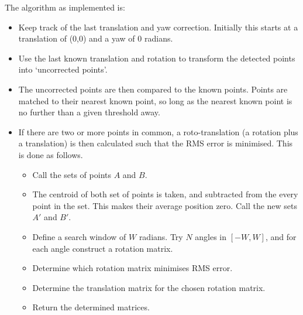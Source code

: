 \documentclass[12pt,oneside,a4paper]{book}
\begin{document}
The algorithm as implemented is:
\begin{itemize}
\item Keep track of the last translation and yaw correction. Initially
  this starts at a translation of (0,0) and a yaw of 0 radians.
\item Use the last known translation and rotation to transform the
  detected points into `uncorrected points'.
\item The uncorrected points are then compared to the known
  points. Points are matched to their nearest known point, so long as
  the nearest known point is no further than a given threshold away.
\item If there are two or more points in common, a roto-translation (a
  rotation plus a translation) is then calculated such that the RMS
  error is minimised. This is done as follows. 
  \begin{itemize}
  \item Call the sets of points $A$ and $B$.
  \item The centroid of both set of points is taken, and subtracted
    from the every point in the set. This makes their average position
    zero. Call the new sets $A'$ and $B'$.
  \item Define a search window of $W$ radians. Try $N$ angles in
    $[-W,W]$, and for each angle construct a rotation matrix.
  \item Determine which rotation matrix minimises RMS error.
  \item Determine the translation matrix for the chosen rotation
    matrix.
  \item Return the determined matrices.
  \end{itemize}


\end{itemize}
\end{document}
